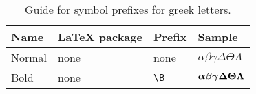 \documentclass[]{article}
\begin{document}
\begin{table}[htbp]
  \centering
\begin{tabular}{p{14em} l l l}
  \toprule
  Name & \LaTeX{} package & Prefix & Sample \\
  \midrule
  Normal & none & none & $\alpha\beta\gamma\Delta\Theta\Lambda$ \\
  Bold & none & \verb+\B+ & $\boldsymbol{\alpha}\boldsymbol{\beta}\boldsymbol{\gamma}\boldsymbol{\Delta}\boldsymbol{\Theta}\boldsymbol{\Lambda}$ \\
  \bottomrule
\end{tabular}
\caption{Guide for symbol prefixes for greek letters.}
\label{tb:greek1}
\end{table}
\end{document}
